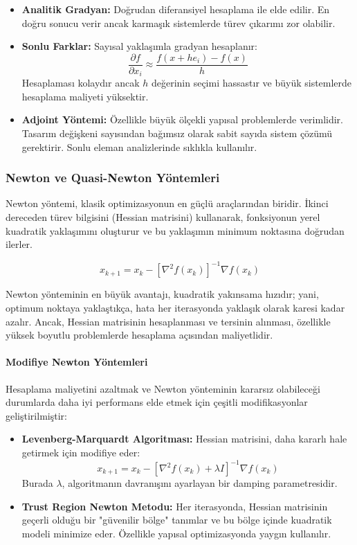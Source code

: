 \begin{itemize}
    \item \textbf{Analitik Gradyan:} Doğrudan diferansiyel hesaplama ile elde edilir. En doğru sonucu verir ancak karmaşık sistemlerde türev çıkarımı zor olabilir.
    
    \item \textbf{Sonlu Farklar:} Sayısal yaklaşımla gradyan hesaplanır:
    $$\frac{\partial f}{\partial x_i} \approx \frac{f(x + h e_i) - f(x)}{h}$$
    Hesaplaması kolaydır ancak $h$ değerinin seçimi hassastır ve büyük sistemlerde hesaplama maliyeti yüksektir.
    
    \item \textbf{Adjoint Yöntemi:} Özellikle büyük ölçekli yapısal problemlerde verimlidir. Tasarım değişkeni sayısından bağımsız olarak sabit sayıda sistem çözümü gerektirir. Sonlu eleman analizlerinde sıklıkla kullanılır.
\end{itemize}

\subsubsection{Newton ve Quasi-Newton Yöntemleri}
Newton yöntemi, klasik optimizasyonun en güçlü araçlarından biridir. İkinci dereceden türev bilgisini (Hessian matrisini) kullanarak, fonksiyonun yerel kuadratik yaklaşımını oluşturur ve bu yaklaşımın minimum noktasına doğrudan ilerler.

\begin{equation}
x_{k+1} = x_k - [\nabla^2 f(x_k)]^{-1} \nabla f(x_k)
\end{equation}

Newton yönteminin en büyük avantajı, kuadratik yakınsama hızıdır; yani, optimum noktaya yaklaştıkça, hata her iterasyonda yaklaşık olarak karesi kadar azalır. Ancak, Hessian matrisinin hesaplanması ve tersinin alınması, özellikle yüksek boyutlu problemlerde hesaplama açısından maliyetlidir.

\paragraph{Modifiye Newton Yöntemleri}
Hesaplama maliyetini azaltmak ve Newton yönteminin kararsız olabileceği durumlarda daha iyi performans elde etmek için çeşitli modifikasyonlar geliştirilmiştir:

\begin{itemize}
    \item \textbf{Levenberg-Marquardt Algoritması:} Hessian matrisini, daha kararlı hale getirmek için modifiye eder:
    $$x_{k+1} = x_k - [\nabla^2 f(x_k) + \lambda I]^{-1} \nabla f(x_k)$$
    Burada $\lambda$, algoritmanın davranışını ayarlayan bir damping parametresidir.
    
    \item \textbf{Trust Region Newton Metodu:} Her iterasyonda, Hessian matrisinin geçerli olduğu bir "güvenilir bölge" tanımlar ve bu bölge içinde kuadratik modeli minimize eder. Özellikle yapısal optimizasyonda yaygın kullanılır.
\end{itemize}

